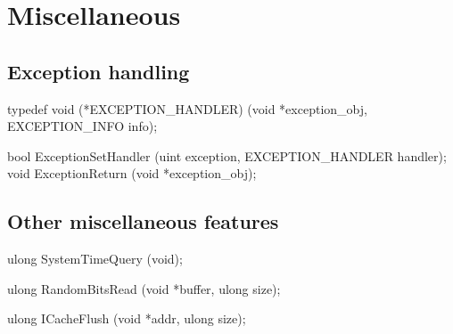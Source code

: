 \section{Miscellaneous}
\label{sec:abi:misc}







\subsection*{Exception handling}



\begin{paldef}
typedef void (*EXCEPTION_HANDLER)
            (void *exception_obj, EXCEPTION_INFO info);
\end{paldef}



\begin{paldef}
bool ExceptionSetHandler  (uint exception,
                           EXCEPTION_HANDLER handler);
void ExceptionReturn      (void *exception_obj);
\end{paldef}




\subsection*{Other miscellaneous features}



\begin{paldef}
ulong SystemTimeQuery (void);
\end{paldef}


\begin{paldef}
ulong RandomBitsRead (void *buffer, ulong size);
\end{paldef}


\begin{paldef}
ulong ICacheFlush (void *addr, ulong size);
\end{paldef}
